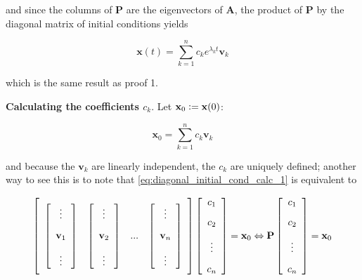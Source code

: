 	and since the columns of $\mathbf{P}$ are the eigenvectors of $\mathbf{A}$, the product of $\mathbf{P}$ by the diagonal matrix of initial conditions yields

\begin{equation} \mathbf{x}(t) = \sum\limits_{k=1}^n c_ke^{\lambda_k t} \mathbf{v}_k \end{equation}

	which is the same result as proof 1.

\textbf{Calculating the coefficients $c_k$}. Let $\mathbf{x}_0 \vcentcolon = \mathbf{x}(0)$:

\begin{equation} \mathbf{x}_0 = \sum\limits_{k=1}^n c_k \mathbf{v}_k \label{eq:diagonal_initial_cond_calc_1}\end{equation}

	and because the $\mathbf{v}_k$ are linearly independent, the $c_k$ are uniquely defined; another way to see this is to note that \eqref{eq:diagonal_initial_cond_calc_1} is equivalent to

\begin{equation} \left[\raisebox{15mm}{} \begin{array}{cccc} \left[\begin{array}{c} \vdots \\[3mm] \mathbf{v}_1 \\[3mm] \vdots \end{array}\right] & \left[\begin{array}{c} \vdots \\[3mm] \mathbf{v}_2 \\[3mm] \vdots \end{array}\right] & ... & \left[\begin{array}{c} \vdots \\[3mm] \mathbf{v}_n \\[3mm] \vdots \end{array}\right] \end{array}\right] \left[\begin{array}{c} c_1 \\[3mm] c_2 \\[3mm] \vdots \\[3mm] c_n \end{array}\right] = \mathbf{x}_0 \Leftrightarrow \mathbf{P} \left[\begin{array}{c} c_1 \\[3mm] c_2 \\[3mm] \vdots \\[3mm] c_n \end{array}\right] = \mathbf{x}_0 \label{eq:diagonal_initial_cond_calc_2}\end{equation}

